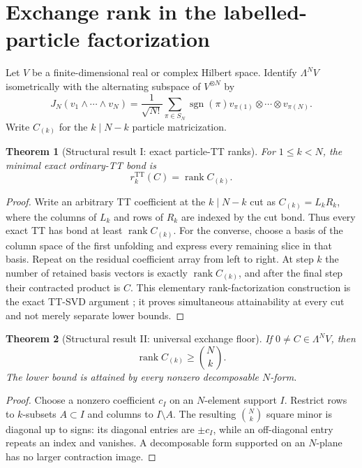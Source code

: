 \documentclass[11pt]{article}
\newtheorem{theorem}{Theorem}[section]
\theoremstyle{definition}
\newcommand{\TT}{\mathrm{TT}}
\newcommand{\rank}{\operatorname{rank}}
\begin{document}
\section{Exchange rank in the labelled-particle factorization}

Let $V$ be a finite-dimensional real or complex Hilbert space.  Identify
$\Lambda^N V$ isometrically with the alternating subspace of $V^{\otimes N}$
by
\[
 J_N(v_1\wedge\cdots\wedge v_N)=\frac{1}{\sqrt{N!}}
 \sum_{\pi\in S_N}\operatorname{sgn}(\pi)
 v_{\pi(1)}\otimes\cdots\otimes v_{\pi(N)}.
\]
Write $C_{(k)}$ for the $k\mid N-k$ particle matricization.

\begin{theorem}[Structural result I: exact particle-TT ranks]
For $1\le k<N$, the minimal exact ordinary-TT bond is
\[
 r_k^{\TT}(C)=\rank C_{(k)}.
\]
\label{thm:r1}
\end{theorem}

\begin{proof}
Write an arbitrary TT coefficient at the $k\mid N-k$ cut as
$C_{(k)}=L_kR_k$, where the columns of $L_k$ and rows of $R_k$ are indexed by
the cut bond.  Thus every exact TT has bond at least $\rank C_{(k)}$.  For the
converse, choose a basis of the column space of the first unfolding and express
every remaining slice in that basis.  Repeat on the residual coefficient array
from left to right.  At step $k$ the number of retained basis vectors is
exactly $\rank C_{(k)}$, and after the final step their contracted product is
$C$.  This elementary rank-factorization construction is the exact TT-SVD
argument \cite{Oseledets2011TT}; it proves simultaneous attainability at every
cut and not merely separate lower bounds.
\end{proof}

\begin{theorem}[Structural result II: universal exchange floor]
If $0\ne C\in\Lambda^N V$, then
\[
\rank C_{(k)}\ge \binom{N}{k}.
\]
The lower bound is attained by every nonzero decomposable $N$-form.
\label{thm:exchange-floor}
\end{theorem}

\begin{proof}
Choose a nonzero coefficient $c_I$ on an $N$-element support $I$.  Restrict rows to
$k$-subsets $A\subset I$ and columns to $I\setminus A$.  The resulting
$\binom{N}{k}$ square minor is diagonal up to signs: its diagonal entries are
$\pm c_I$, while an off-diagonal entry repeats an index and vanishes.
A decomposable form supported on an $N$-plane has no larger contraction image.
\end{proof}
\end{document}
